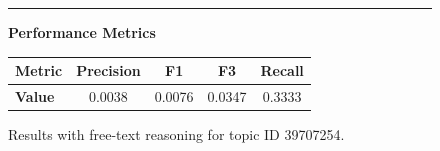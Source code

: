 \begin{figure}[p]
\begin{CombinedBox}
		\vspace{0.5em}
		\hrule
		\vspace{0.5em}
		
		\textbf{\small Performance Metrics}
		
		\vspace{0.3em}
		{\small
			\begin{tabular}{@{}lcccc@{}}
				\toprule
				\textbf{Metric} & Precision & F1 & F3 & Recall \\
				\midrule
				\textbf{Value} & 0.0038 & 0.0076 & 0.0347 & 0.3333 \\
				\bottomrule
			\end{tabular}
		}
	\end{CombinedBox}
	
	\caption{Results with free-text reasoning for topic ID 39707254.}
	\label{fig:topic_39707254_reasoning}
\end{figure}



